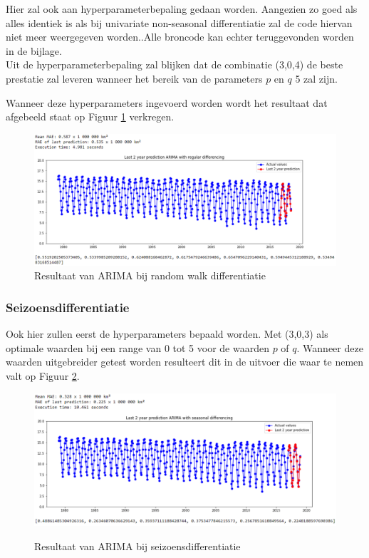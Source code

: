 Hier zal ook aan hyperparameterbepaling gedaan worden. Aangezien zo goed als alles identiek is als bij univariate non-seasonal differentiatie zal de code hiervan niet meer weergegeven worden..Alle broncode kan echter teruggevonden worden in de bijlage.\\

Uit de hyperparameterbepaling zal blijken dat de combinatie (3,0,4) de beste prestatie zal leveren wanneer het bereik van de parameters $p$ en $q$ 5 zal zijn. 

Wanneer deze hyperparameters ingevoerd worden wordt het resultaat dat afgebeeld staat op Figuur \ref{fig:uvsarimadiff} verkregen.

\begin{figure}[!h]
    \centering
    \caption{Resultaat van ARIMA bij random walk differentiatie}
    \label{fig:uvsarimadiff}
    \includegraphics[width=1\linewidth]{uv_s_arima_diff}
\end{figure}

\clearpage
\subsubsection{Seizoensdifferentiatie}

Ook hier zullen eerst de hyperparameters bepaald worden. Met (3,0,3) als optimale waarden bij een range van 0 tot 5 voor de waarden $p$ of $q$. Wanneer deze waarden uitgebreider getest worden resulteert dit in de uitvoer die waar te nemen valt op Figuur \ref{fig:uvsarimasdiff}.


\begin{figure}[!h]
    \centering
    \caption{Resultaat van ARIMA bij seizoensdifferentiatie}
    \includegraphics[width=1\linewidth]{uv_s_arima_sdiff}
    \label{fig:uvsarimasdiff}
\end{figure}

